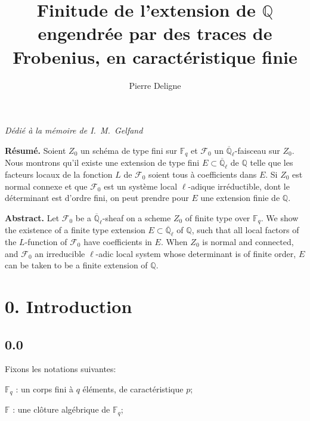 \documentclass[11pt,a4paper]{article}
\theoremstyle{plain}
\theoremstyle{definition}
\begin{document}
\title{Finitude de l'extension de $\mathbb{Q}$ engendr\'ee par des traces de Frobenius, en caract\'eristique finie}
\author{Pierre Deligne}
\date{}
\maketitle

\begin{center}
\textit{D\'edi\'e \`a la m\'emoire de I.~M.~Gelfand}
\end{center}

\noindent\textbf{R\'esum\'e.} Soient $Z_0$ un sch\'ema de type fini sur $\mathbb{F}_q$ et $\mathcal{F}_0$ un $\overline{\mathbb{Q}}_\ell$-faisceau sur $Z_0$. Nous montrons qu'il existe une extension de type fini $E \subset \overline{\mathbb{Q}}_\ell$ de $\mathbb{Q}$ telle que les facteurs locaux de la fonction $L$ de $\mathcal{F}_0$ soient tous \`a coefficients dans $E$. Si $Z_0$ est normal connexe et que $\mathcal{F}_0$ est un syst\`eme local $\ell$-adique irr\'eductible, dont le d\'eterminant est d'ordre fini, on peut prendre pour $E$ une extension finie de $\mathbb{Q}$.

\medskip
\noindent\textbf{Abstract.} Let $\mathcal{F}_0$ be a $\overline{\mathbb{Q}}_\ell$-sheaf on a scheme $Z_0$ of finite type over $\mathbb{F}_q$. We show the existence of a finite type extension $E \subset \overline{\mathbb{Q}}_\ell$ of $\mathbb{Q}$, such that all local factors of the $L$-function of $\mathcal{F}_0$ have coefficients in $E$. When $Z_0$ is normal and connected, and $\mathcal{F}_0$ an irreducible $\ell$-adic local system whose determinant is of finite order, $E$ can be taken to be a finite extension of $\mathbb{Q}$.

\tableofcontents

\section*{0. Introduction}

\subsection*{0.0}

Fixons les notations suivantes:

$\mathbb{F}_q$ : un corps fini \`a $q$ \'el\'ements, de caract\'eristique $p$;

$\mathbb{F}$ : une cl\^oture alg\'ebrique de $\mathbb{F}_q$;
\end{document}
